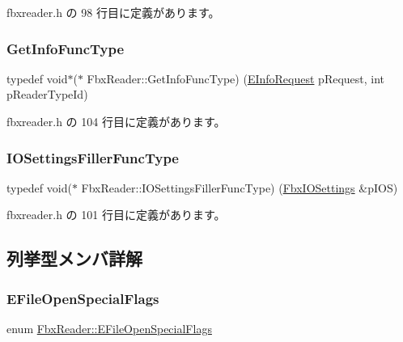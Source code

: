  fbxreader.\+h の 98 行目に定義があります。

\mbox{\label{class_fbx_reader_a86477804a6ed54e7f99a1887aa50f256}} 
\subsubsection{\texorpdfstring{Get\+Info\+Func\+Type}{GetInfoFuncType}}
{\footnotesize\ttfamily typedef void$\ast$($\ast$ Fbx\+Reader\+::\+Get\+Info\+Func\+Type) (\hyperlink{class_fbx_reader_a33badbb2641958ab0772ec2c06a71e11}{E\+Info\+Request} p\+Request, int p\+Reader\+Type\+Id)}



 fbxreader.\+h の 104 行目に定義があります。

\mbox{\label{class_fbx_reader_aa8d17b6ac89ea7229a3a1510fbccec73}} 
\subsubsection{\texorpdfstring{I\+O\+Settings\+Filler\+Func\+Type}{IOSettingsFillerFuncType}}
{\footnotesize\ttfamily typedef void($\ast$ Fbx\+Reader\+::\+I\+O\+Settings\+Filler\+Func\+Type) (\hyperlink{class_fbx_i_o_settings}{Fbx\+I\+O\+Settings} \&p\+I\+OS)}



 fbxreader.\+h の 101 行目に定義があります。



\subsection{列挙型メンバ詳解}
\mbox{\label{class_fbx_reader_a1a14bd907bcda7dd48ba9b0a6236b7b8}} 
\subsubsection{\texorpdfstring{E\+File\+Open\+Special\+Flags}{EFileOpenSpecialFlags}}
{\footnotesize\ttfamily enum \hyperlink{class_fbx_reader_a1a14bd907bcda7dd48ba9b0a6236b7b8}{Fbx\+Reader\+::\+E\+File\+Open\+Special\+Flags}}

